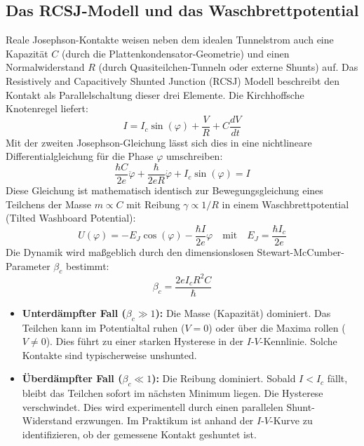 \subsection{Das RCSJ-Modell und das Waschbrettpotential}
Reale Josephson-Kontakte weisen neben dem idealen Tunnelstrom auch eine Kapazität $C$ (durch die Plattenkondensator-Geometrie) und einen Normalwiderstand $R$ (durch Quasiteilchen-Tunneln oder externe Shunts) auf. Das Resistively and Capacitively Shunted Junction (RCSJ) Modell beschreibt den Kontakt als Parallelschaltung dieser drei Elemente. Die Kirchhoffsche Knotenregel liefert:
\begin{equation}
    I = I_c \sin(\varphi) + \frac{V}{R} + C \frac{dV}{dt}
\end{equation}
Mit der zweiten Josephson-Gleichung lässt sich dies in eine nichtlineare Differentialgleichung für die Phase $\varphi$ umschreiben:
\begin{equation}
    \frac{\hbar C}{2e} \ddot{\varphi} + \frac{\hbar}{2eR} \dot{\varphi} + I_c \sin(\varphi) = I
\end{equation}
Diese Gleichung ist mathematisch identisch zur Bewegungsgleichung eines Teilchens der Masse $m \propto C$ mit Reibung $\gamma \propto 1/R$ in einem Waschbrettpotential (Tilted Washboard Potential):
\begin{equation}
    U(\varphi) = -E_J \cos(\varphi) - \frac{\hbar I}{2e} \varphi \quad \text{mit} \quad E_J = \frac{\hbar I_c}{2e}
\end{equation}
Die Dynamik wird maßgeblich durch den dimensionslosen Stewart-McCumber-Parameter $\beta_c$ bestimmt:
\begin{equation}
    \beta_c = \frac{2e I_c R^2 C}{\hbar}
\end{equation}
\begin{itemize}
    \item \textbf{Unterdämpfter Fall ($\beta_c \gg 1$):} Die Masse (Kapazität) dominiert. Das Teilchen kann im Potentialtal ruhen ($V=0$) oder über die Maxima rollen ($V \neq 0$). Dies führt zu einer starken Hysterese in der $I$-$V$-Kennlinie. Solche Kontakte sind typischerweise unshunted.
    \item \textbf{Überdämpfter Fall ($\beta_c \ll 1$):} Die Reibung dominiert. Sobald $I < I_c$ fällt, bleibt das Teilchen sofort im nächsten Minimum liegen. Die Hysterese verschwindet. Dies wird experimentell durch einen parallelen Shunt-Widerstand erzwungen. Im Praktikum ist anhand der $I$-$V$-Kurve zu identifizieren, ob der gemessene Kontakt geshuntet ist.
\end{itemize}

